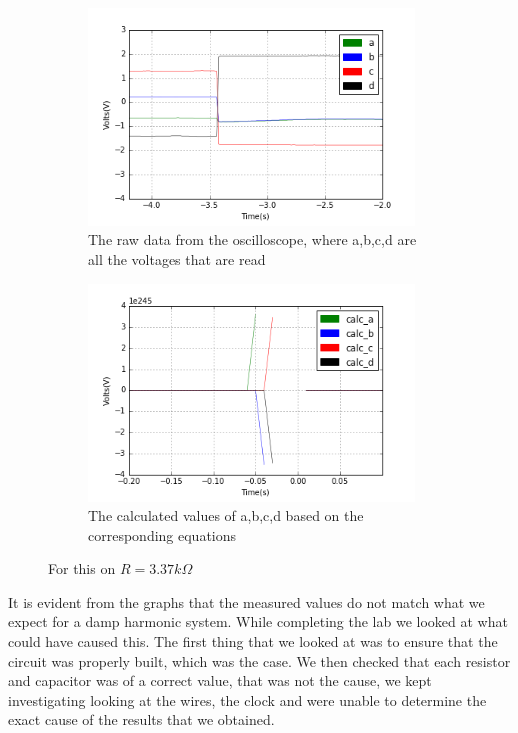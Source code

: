 \begin{figure}[h!]
\centering
\begin{subfigure}[t]{.475\textwidth}
  \centering
  \includegraphics[width=0.95\textwidth, height=0.25\textheight]{figures/DHO/scope_37raw.png}
  \caption{The raw data from the oscilloscope, where a,b,c,d are all the voltages that are read}
 \label{fig:sum_7_og_data}
\end{subfigure}\hfill
\begin{subfigure}[t]{.475\textwidth}
  \centering
  \includegraphics[width=0.95\textwidth, height=0.25\textheight]{figures/DHO/scope_37calc.png}
  \caption{The calculated values of a,b,c,d based on the corresponding equations}
\label{fig:sum_7_calc_data}
\end{subfigure}
\caption{For this on $R = 3.37k\Omega$}
\label{fig:sum_7}
\end{figure}
 It is evident from the graphs that the measured values do not match what we expect for a damp harmonic system. While completing the lab we looked at what could have caused this. The first thing that we looked at was to ensure that the circuit was properly built, which was the case. We then checked that each resistor and capacitor was of a correct value, that was not the cause, we kept investigating looking at the wires, the clock and were unable to determine the exact cause of the results that we obtained.
\clearpage

